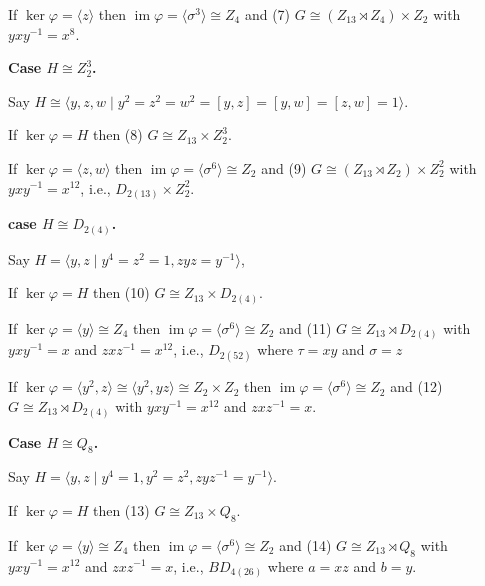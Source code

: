\documentclass[12pt]{article}
\theoremstyle{definition}
\renewcommand{\phi}{\varphi}
\newcommand{\<}{\langle}
\renewcommand{\>}{\rangle}
\newcommand{\isom}{\cong}
\DeclareMathOperator{\im}{im}
\begin{document}
If $\ker\phi = \<z\>$ then $\im\phi = \<\sigma^3\> \isom Z_4$ and (7) $G \isom (Z_{13} \rtimes Z_4) \times Z_2$ with $yxy^{-1} = x^8$.


\textbf{Case $H \isom Z_2^3$.} 

Say $H \isom \<y, z, w \mid y^2 = z^2 = w^2 = [y, z] = [y, w] = [z, w] = 1\>$.

If $\ker\phi = H$ then (8) $G \isom Z_{13} \times Z_2^3$.

If $\ker\phi = \<z, w\>$ then $\im\phi = \<\sigma^6\> \isom Z_2$ and (9) $G \isom (Z_{13} \rtimes Z_2) \times Z_2^2$ with $yxy^{-1} = x^{12}$, i.e., $D_{2(13)} \times Z_2^2$.

\textbf{case $H \isom D_{2(4)}$.} 

Say $H = \<y, z \mid y^4 = z^2 = 1, zyz = y^{-1}\>$, 

If $\ker\phi = H$ then (10) $G \isom Z_{13} \times D_{2(4)}$.

If $\ker\phi = \<y\> \isom Z_4$ then $\im\phi = \<\sigma^6\> \isom Z_2$ and (11) $G \isom Z_{13} \rtimes D_{2(4)}$ with $yxy^{-1} = x$ and $zxz^{-1} = x^{12}$, i.e., $D_{2(52)}$ where $\tau = xy$ and $\sigma = z$

If $\ker\phi = \<y^2, z\> \isom \<y^2, yz\> \isom Z_2 \times Z_2$ then $\im\phi = \<\sigma^6\> \isom Z_2$ and (12) $G \isom Z_{13} \rtimes D_{2(4)}$ with $yxy^{-1} = x^{12}$ and $zxz^{-1} = x$.

\textbf{Case $H \isom Q_8$.}

Say $H = \<y, z \mid y^4 = 1, y^2 = z^2, zyz^{-1} = y^{-1}\>$.

If $\ker\phi = H$ then (13) $G \isom Z_{13} \times Q_8$.

If $\ker\phi = \<y\> \isom Z_4$ then $\im\phi = \<\sigma^6\> \isom Z_2$ and (14) $G \isom Z_{13} \rtimes Q_8$ with $yxy^{-1} = x^{12}$ and $zxz^{-1} = x$, i.e., $BD_{4(26)}$ where $a = xz$ and $b = y$.

\newpage
\end{document}

